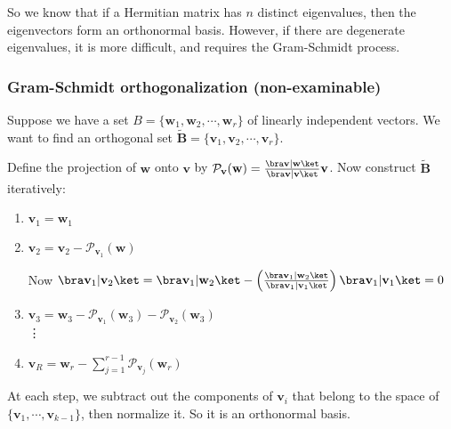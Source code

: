\documentclass[a4paper]{article}
\begin{document}
      So we know that if a Hermitian matrix has $n$ distinct eigenvalues, then the eigenvectors form an orthonormal basis. However, if there are degenerate eigenvalues, it is more difficult, and requires the Gram-Schmidt process.

      \subsubsection{Gram-Schmidt orthogonalization (non-examinable)}
      Suppose we have a set $B = \{\mathbf{w}_1, \mathbf{w}_2, \cdots, \mathbf{w}_r\}$ of linearly independent vectors. We want to find an orthogonal set $\tilde{\mathbf{B}} = \{\mathbf{v}_1, \mathbf{v}_2, \cdots, \mathbf{v}_r\}$.

      Define the projection of $\mathbf{w}$ onto $\mathbf{v}$ by $\mathcal{P}_\mathbf{v}(\mathbf{w}) = \frac{\bra \mathbf{v}|\mathbf{w}\ket}{\bra \mathbf{v}|\mathbf{v}\ket} \mathbf{v}$. Now construct $\tilde{\mathbf{B}}$ iteratively:
      \begin{enumerate}
        \item $\mathbf{v}_1 = \mathbf{w}_1$
        \item $\mathbf{v}_2 = \mathbf{v}_2 - \mathcal{P}_{\mathbf{v}_1}(\mathbf{w})$

          \note Now $\bra \mathbf{v}_1|\mathbf{v}_2\ket = \bra \mathbf{v}_1|\mathbf{w}_2\ket - \left(\frac{\bra \mathbf{v}_1|\mathbf{w}_2\ket}{\bra \mathbf{v}_1 | \mathbf{v}_1\ket}\right) \bra \mathbf{v}_1|\mathbf{v}_1\ket = 0$
        \item $\mathbf{v}_3 = \mathbf{w}_3 - \mathcal{P}_{\mathbf{v}_1}(\mathbf{w}_3) - \mathcal{P}_{\mathbf{v}_2}(\mathbf{w}_3)$\\
          \vdots
        \item $\displaystyle \mathbf{v}_R = \mathbf{w}_r - \sum_{j = 1}^{r - 1} \mathcal{P}_{\mathbf{v}_j}(\mathbf{w}_r)$
      \end{enumerate}
      At each step, we subtract out the components of $\mathbf{v}_i$ that belong to the space of $\{\mathbf{v}_1, \cdots, \mathbf{v}_{k - 1}\}$, then normalize it. So it is an orthonormal basis.
\end{document}
